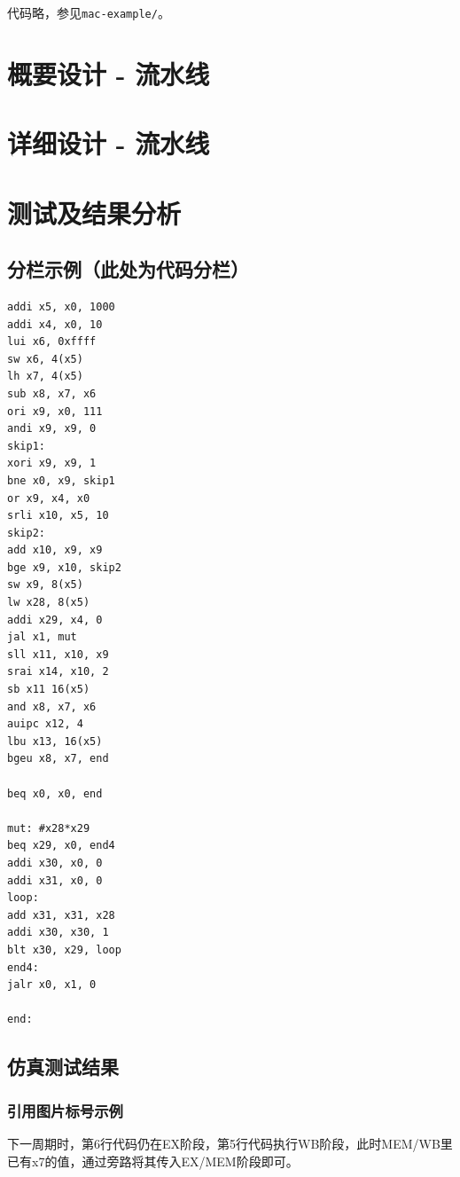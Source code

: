 \documentclass[UTF8,a4paper,autofakebold,15pt]{ctexart}
\begin{document}
代码略，参见{\tt mac-example/}。

\newpage
\section{概要设计 - 流水线}

\section{详细设计 - 流水线}

\newpage
\section{测试及结果分析}

\subsection{分栏示例（此处为代码分栏）}

\begin{multicols}{2}
{
\begin{lstlisting}
addi x5, x0, 1000
addi x4, x0, 10
lui x6, 0xffff
sw x6, 4(x5)
lh x7, 4(x5)
sub x8, x7, x6
ori x9, x0, 111
andi x9, x9, 0
skip1:
xori x9, x9, 1
bne x0, x9, skip1
or x9, x4, x0
srli x10, x5, 10
skip2:
add x10, x9, x9
bge x9, x10, skip2
sw x9, 8(x5)
lw x28, 8(x5)
addi x29, x4, 0
jal x1, mut
sll x11, x10, x9
srai x14, x10, 2
sb x11 16(x5)
and x8, x7, x6
auipc x12, 4
lbu x13, 16(x5)
bgeu x8, x7, end

beq x0, x0, end

mut: #x28*x29
beq x29, x0, end4
addi x30, x0, 0
addi x31, x0, 0
loop:
add x31, x31, x28
addi x30, x30, 1
blt x30, x29, loop
end4:
jalr x0, x1, 0

end:
\end{lstlisting}}
\end{multicols}
\subsection{仿真测试结果}
\subsubsection{引用图片标号示例}

下一周期时，第6行代码仍在EX阶段，第5行代码执行WB阶段，此时MEM/WB里已有x7的值，通过旁路将其传入EX/MEM阶段即可。

{\color{red}{注意下一行“图”后面的数字可以点击。}}
\end{document}
